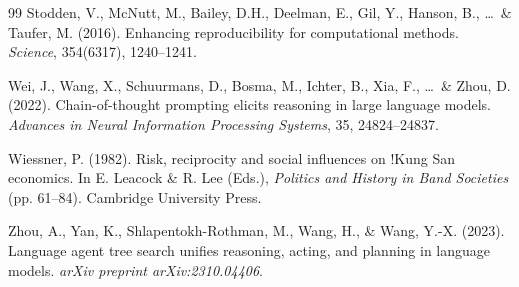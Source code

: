 \documentclass[11pt,a4paper]{article}
\begin{document}
\begin{thebibliography}{99}
Stodden, V., McNutt, M., Bailey, D.H., Deelman, E., Gil, Y., Hanson, B., \ldots\ \& Taufer, M. (2016).
\newblock Enhancing reproducibility for computational methods.
\newblock \textit{Science}, 354(6317), 1240--1241.

Wei, J., Wang, X., Schuurmans, D., Bosma, M., Ichter, B., Xia, F., \ldots\ \& Zhou, D. (2022).
\newblock Chain-of-thought prompting elicits reasoning in large language models.
\newblock \textit{Advances in Neural Information Processing Systems}, 35, 24824--24837.

Wiessner, P. (1982).
\newblock Risk, reciprocity and social influences on !Kung San economics.
\newblock In E. Leacock \& R. Lee (Eds.), \textit{Politics and History in Band Societies} (pp. 61--84). Cambridge University Press.

Zhou, A., Yan, K., Shlapentokh-Rothman, M., Wang, H., \& Wang, Y.-X. (2023).
\newblock Language agent tree search unifies reasoning, acting, and planning in language models.
\newblock \textit{arXiv preprint arXiv:2310.04406}.

\end{thebibliography}
\end{document}
